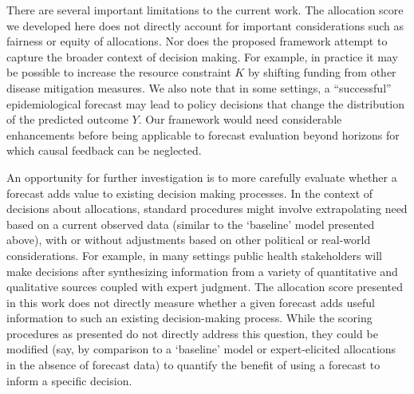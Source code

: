 \documentclass{article}\usepackage[]{graphicx}\usepackage[]{xcolor}
\begin{document}
There are several important limitations to the current work.
The allocation score we developed here does not directly account for important considerations such as fairness or equity of allocations.
Nor does the proposed framework attempt to capture the broader context of decision making. For example, in practice it may be possible to increase the resource constraint $K$ by shifting funding from other disease mitigation measures.
We also note that in some settings, a ``successful'' epidemiological forecast may lead to policy decisions that change the distribution of the predicted outcome $Y$. Our framework would need considerable enhancements before being applicable to forecast evaluation beyond horizons
for which causal feedback can be neglected.

An opportunity for further investigation is to more carefully evaluate whether a forecast adds value to existing decision making processes.
In the context of decisions about allocations, standard procedures might involve extrapolating need based on a current observed data (similar to the `baseline' model presented above), with or without adjustments based on other political or real-world considerations.
For example, in many settings public health stakeholders will make decisions after synthesizing information from a variety of quantitative and qualitative sources coupled with expert judgment.
The allocation score presented in this work does not directly measure whether a given forecast adds useful information to such an existing decision-making process.
While the scoring procedures as presented do not directly address this question, they could be modified (say, by comparison to a `baseline' model or expert-elicited allocations in the absence of forecast data) to quantify the benefit of using a forecast to inform a specific decision.

\end{document}
